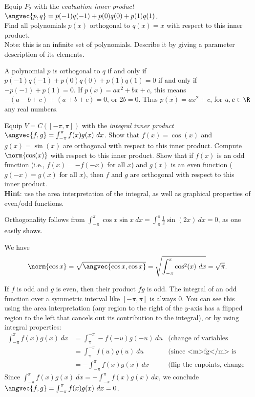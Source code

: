 \ii Equip $P_2$ with the {\em evaluation inner product}  $\angvec{p,q}=p(-1)q(-1)+p(0)q(0)+p(1)q(1)$. 
\\
Find all polynomials $p(x)$ orthogonal to $q(x)=x$ with respect to this inner product. 
\\
Note: this is an infinite set of polynomials. Describe it by giving a parameter description of its elements.
\\
\begin{solution}
\noindent A polynomial $p$ is orthogonal to $q$ if and only if $p(-1)q(-1)+p(0)q(0)+p(1)q(1)=0$ if and only if $-p(-1)+p(1)=0$. If $p(x)=ax^2+bx+c$, this means $-(a-b+c)+(a+b+c)=0$, or $2b=0$. Thus $p(x)=ax^2+c$, for $a,c\in\R$ any real numbers. 
\end{solution} 
\ii Equip $V=C([-\pi,\pi])$ with the {\em integral inner product} $\angvec{f, g}=\int_{-\pi}^\pi f(x)g(x) \ dx$.
\bb
\ii Show that $f(x)=\cos(x)$ and $g(x)=\sin(x)$ are orthogonal with respect to this inner product. 
\ii Compute $\norm{\cos(x)}$ with respect to this inner product. 
\ii Show that if $f(x)$ is an odd function (i.e., $f(x)=-f(-x)$ for all $x$) and $g(x)$ is an even function ($g(-x)=g(x)$ for all $x$), then $f$ and $g$ are orthogonal with respect to this inner product.  
\\
{\bf Hint}: use the area interpretation of the integral, as well as graphical properties of even/odd functions. 
\ee 
\begin{solution}
\noindent 
Orthogonality follows from $\int_{-\pi}^\pi \cos x\sin x\ dx=\int_{\pi}^{\pi}\frac{1}{2}\sin(2x)\ dx=0$, as one easily shows. 

We have 
\[
\norm{\cos x}=\sqrt{\angvec{\cos x, \cos x}}=\sqrt{\int_{-\pi}^\pi \cos^2(x) \ dx}=\sqrt{\pi}. 
\]

If $f$ is odd and $g$ is even, then their product $fg$ is odd. The integral of an odd function over a symmetric interval like $[-\pi, \pi]$ is always 0. You can see this using the area interpretation (any region to the right of the $y$-axis has a flipped region to the left that cancels out its contribution to the integral), or by using integral properties:
\begin{align*}
\int_{-\pi}^\pi f(x)g(x) \ dx&=\int_{\pi}^{-\pi} -f(-u)g(-u) \ du &\text{(change of variables <m>u=-x, du=-dx</m>)}\\
&= \int_{\pi}^{-\pi} f(u)g(u) \ du&\text{(since <m>fg</m> is odd)}\\
&=-\int_{-\pi}^\pi f(x)g(x) \ dx &\text{(flip the enpoints, change variable name)}
\end{align*}
Since $\int_{-\pi}^\pi f(x)g(x) \ dx=-\int_{-\pi}^\pi f(x)g(x) \ dx$, we conclude $\angvec{f, g}=\int_{-\pi}^\pi f(x)g(x) \ dx=0$. 
\end{solution}
